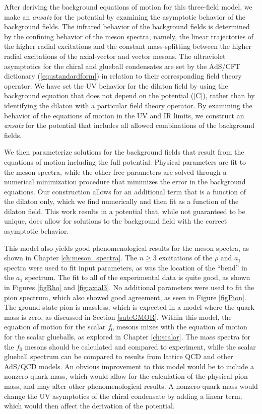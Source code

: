 After deriving the background equations of motion for this three-field model, we make an \emph{ansatz} for the potential by examining the asymptotic behavior of the background fields.
The infrared behavior of the background fields is determined by the confining behavior of the meson spectra, namely, the linear trajectories of the higher radial excitations and the constant mass-splitting between the higher radial excitations of the axial-vector and vector mesons.
The ultraviolet asymptotics for the chiral and glueball condensates are set by the AdS/CFT dictionary (\ref{equstandardform}) in relation to their corresponding field theory operator.
We have set the UV behavior for the dilaton field by using the background equation that does not depend on the potential (\ref{C}), rather than by identifying the dilaton with a particular field theory operator. 
By examining the behavior of the equations of motion in the UV and IR limits, we construct an \emph{ansatz} for the potential that includes all allowed combinations of the background fields.

We then parameterize solutions for the background fields that result from the equations of motion including the full potential.
Physical parameters are fit to the meson spectra, while the other free parameters are solved through a numerical minimization procedure that minimizes the error in the background equations.
Our construction allows for an additional term that is a function of the dilaton only, which we find numerically and then fit as a function of the dilaton field.
This work results in a potential that, while not guaranteed to be unique, does allow for solutions to the background field with the correct asymptotic behavior.

This model also yields good phenomenological results for the meson spectra, as shown in Chapter \ref{ch:meson_spectra}.
The $n\ge3$ excitations of the $\rho$ and $a_1$ spectra were used to fit input parameters, as was the location of the ``bend'' in the $a_1$ spectrum.
The fit to all of the experimental data is quite good, as shown in Figures \ref{figRho} and \ref{fig:axial3}.
No additional parameters were used to fit the pion spectrum, which also showed good agreement, as seen in Figure \ref{figPion}.
The ground state pion is massless, which is expected in a model where the quark mass is zero, as discussed in Section \ref{sub:GMOR}.
Within this model, the equation of motion for the scalar $f_0$ mesons mixes with the equation of motion for the scalar glueballs, as explored in Chapter \ref{ch:scalar}.
The mass spectra for the $f_0$ mesons should be calculated and compared to experiment, while the scalar glueball spectrum can be compared to results from lattice QCD and other AdS/QCD models.
An obvious improvement to this model would be to include a nonzero quark mass, which would allow for the calculation of the physical pion mass, and may alter other phenomenological results.
A nonzero quark mass would change the UV asymptotics of the chiral condensate by adding a linear term, which would then affect the derivation of the potential.

